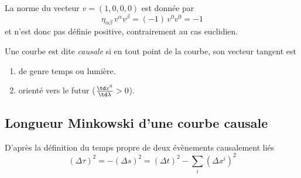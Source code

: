 {\begin{exmp}
    La norme du vecteur $v = (1,0,0,0)$ est donnée par 
    \begin{equation}
        \eta_{\alpha \beta}\,v^{\alpha} v^{\beta} = (-1)\, v^{0} v^{0} =-1
    \end{equation}
    et n'est donc pas définie positive, contrairement au cas euclidien.
\end{exmp}
\begin{theoremframe}
    \begin{defi}
        Une courbe est dite \emph{causale} si en tout point de la courbe, son vecteur tangent est
        \begin{enumerate}[label = \roman*.]
            \item de genre temps ou lumière.
            \item orienté vers le futur ($\frac{\td x^0}{\td\lambda}>0$).
        \end{enumerate}
    \end{defi}
\end{theoremframe}
\subsection{Longueur Minkowski d'une courbe causale}

D'après la définition du temps propre de deux évènements causalement liés
\begin{equation}
    \label{eq:temps propre}
   (\Delta \tau)^{2} = -(\Delta s)^2 = (\Delta t)^2 - \sum_{i}(\Delta x^{i})^2 
\end{equation}

}
